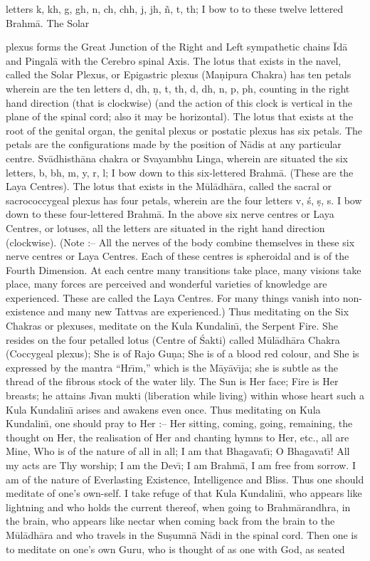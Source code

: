 letters k, kh, g, gh, n, ch, chh, j, jh, \~n, t, th; I bow to to these twelve lettered Brahm\=a. The Solar

plexus forms the Great Junction of the Right and Left sympathetic chains \=Id\=a and Pingal\=a with the Cerebro spinal Axis. The lotus that exists in the navel, called the Solar Plexus, or Epigastric plexus (Ma\d{n}ipura Chakra) has ten petals wherein are the ten letters d, dh, \d{n}, t, th, d, dh, n, p, ph, counting in the right hand direction (that is clockwise) (and the action of this clock is vertical in the plane of the spinal cord; also it may be horizontal). The lotus that exists at the root of the genital organ, the genital plexus or postatic plexus has six petals. The petals are the configurations made by the position of N\=adis at any particular centre. Sv\=adhisth\=ana chakra or Svayambhu Linga, wherein are situated the six letters, b, bh, m, y, r, l; I bow down to this six-lettered Brahm\=a. (These are the Laya Centres). The lotus that exists in the M\=ul\=adh\=ara, called the sacral or sacrococcygeal plexus has four petals, wherein are the four letters v, \'s, \d{s}, s. I bow down to these four-lettered Brahm\=a. In the above six nerve centres or Laya Centres, or lotuses, all the letters are situated in the right hand direction (clockwise). (Note :-- All the nerves of the body combine themselves in these six nerve centres or Laya Centres. Each of these centres is spheroidal and is of the Fourth Dimension. At each centre many transitions take place, many visions take place, many forces are perceived and wonderful varieties of knowledge are experienced. These are called the Laya Centres. For many things vanish into non-existence and many new Tattvas are experienced.) Thus meditating on the Six Chakras or plexuses, meditate on the Kula Kundalin\={\i}, the Serpent Fire. She resides on the four petalled lotus (Centre of \'Sakti) called M\=ul\=adh\=ara Chakra (Coccygeal plexus); She is of Rajo Gu\d{n}a; She is of a blood red colour, and She is expressed by the mantra ``Hr\={\i}m,'' which is the M\=ay\=av\={\i}ja; she is subtle as the thread of the fibrous stock of the water lily. The Sun is Her face; Fire is Her breasts; he attains J\={\i}van mukti (liberation while living) within whose heart such a Kula Kundalin\={\i} arises and awakens even once. Thus meditating on Kula Kundalin\={\i}, one should pray to Her :-- Her sitting, coming, going, remaining, the thought on Her, the realisation of Her and chanting hymns to Her, etc., all are Mine, Who is of the nature of all in all; I am that Bhagavat\={\i}; O Bhagavat\={\i}! All my acts are Thy worship; I am the Dev\={\i}; I am Brahm\=a, I am free from sorrow. I am of the nature of Everlasting Existence, Intelligence and Bliss. Thus one should meditate of one's own-self. I take refuge of that Kula Kundalin\={\i}, who appears like lightning and who holds the current thereof, when going to Brahm\=arandhra, in the brain, who appears like nectar when coming back from the brain to the M\=ul\=adh\=ara and who travels in the Su\d{s}umn\=a N\=adi in the spinal cord. Then one is to meditate on one's own Guru, who is thought of as one with God, as seated

